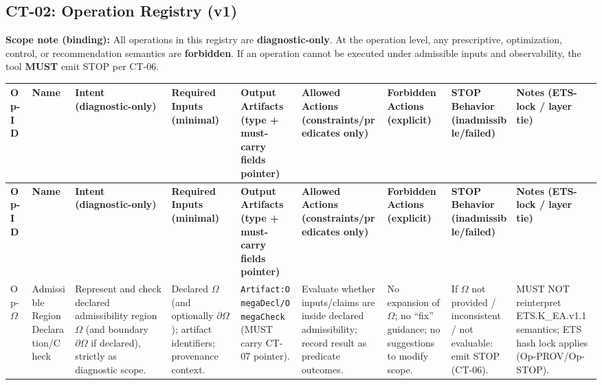 \subsection{CT-02: Operation Registry (v1)}
\noindent\textbf{Scope note (binding):} All operations in this registry are \textbf{diagnostic-only}. At the operation level, any prescriptive, optimization, control, or recommendation semantics are \textbf{forbidden}. If an operation cannot be executed under admissible inputs and observability, the tool \textbf{MUST} emit STOP per CT-06.

\begingroup
\small
\setlength{\LTleft}{0pt}
\setlength{\LTright}{0pt}
\begin{longtable}{|p{1.7cm}|p{2.2cm}|p{3.0cm}|p{3.0cm}|p{3.2cm}|p{3.0cm}|p{3.0cm}|p{3.0cm}|p{2.6cm}|}
\hline
\textbf{Op-ID} & \textbf{Name} & \textbf{Intent (diagnostic-only)} & \textbf{Required Inputs (minimal)} & \textbf{Output Artifacts (type + must-carry fields pointer)} & \textbf{Allowed Actions (constraints/predicates only)} & \textbf{Forbidden Actions (explicit)} & \textbf{STOP Behavior (inadmissible/failed)} & \textbf{Notes (ETS-lock / layer tie)} \\
\hline
\endfirsthead

\hline
\textbf{Op-ID} & \textbf{Name} & \textbf{Intent (diagnostic-only)} & \textbf{Required Inputs (minimal)} & \textbf{Output Artifacts (type + must-carry fields pointer)} & \textbf{Allowed Actions (constraints/predicates only)} & \textbf{Forbidden Actions (explicit)} & \textbf{STOP Behavior (inadmissible/failed)} & \textbf{Notes (ETS-lock / layer tie)} \\
\hline
\endhead

\hline
\endfoot

\hline
\endlastfoot

Op-$\Omega$ &
Admissible Region Declaration/Check &
Represent and check declared admissibility region $\Omega$ (and boundary $\partial\Omega$ if declared), strictly as diagnostic scope. &
Declared $\Omega$ (and optionally $\partial\Omega$); artifact identifiers; provenance context. &
\texttt{Artifact:OmegaDecl/OmegaCheck} (MUST carry CT-07 pointer). &
Evaluate whether inputs/claims are inside declared admissibility; record result as predicate outcomes. &
No expansion of $\Omega$; no ``fix'' guidance; no suggestions to modify scope. &
If $\Omega$ not provided / inconsistent / not evaluable: emit STOP (CT-06). &
MUST NOT reinterpret ETS.K\_EA.v1.1 semantics; ETS hash lock applies (Op-PROV/Op-STOP). \\
\hline


\end{longtable}
